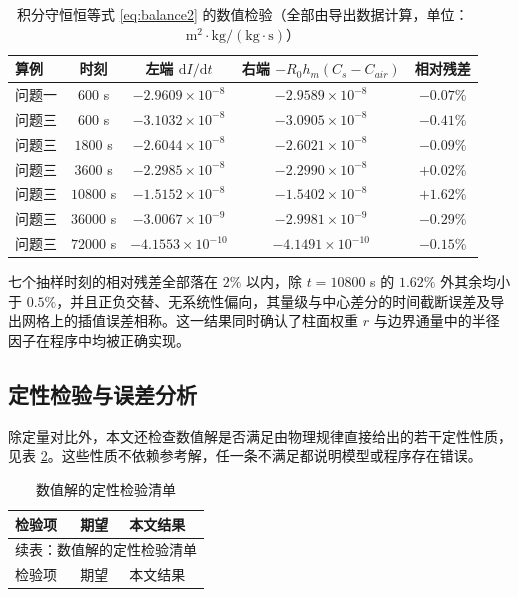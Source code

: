 \documentclass[12pt,a4paper]{article}
\begin{document}
\begin{center}
\begin{table}[H]
\centering
\caption{积分守恒恒等式 \eqref{eq:balance2} 的数值检验（全部由导出数据计算，单位：$\mathrm{m^2\cdot kg/(kg\cdot s)}$）}
\label{tab:balance}
\begin{tabular}{lcccc}
\toprule
算例 & 时刻 & 左端 $\mathrm{d}I/\mathrm{d}t$ & 右端 $-R_0h_m(C_s-C_{air})$ & 相对残差\\
\midrule
问题一 & $600$ s & $-2.9609\times10^{-8}$ & $-2.9589\times10^{-8}$ & $-0.07\%$\\
问题三 & $600$ s & $-3.1032\times10^{-8}$ & $-3.0905\times10^{-8}$ & $-0.41\%$\\
问题三 & $1800$ s & $-2.6044\times10^{-8}$ & $-2.6021\times10^{-8}$ & $-0.09\%$\\
问题三 & $3600$ s & $-2.2985\times10^{-8}$ & $-2.2990\times10^{-8}$ & $+0.02\%$\\
问题三 & $10800$ s & $-1.5152\times10^{-8}$ & $-1.5402\times10^{-8}$ & $+1.62\%$\\
问题三 & $36000$ s & $-3.0067\times10^{-9}$ & $-2.9981\times10^{-9}$ & $-0.29\%$\\
问题三 & $72000$ s & $-4.1553\times10^{-10}$ & $-4.1491\times10^{-10}$ & $-0.15\%$\\
\bottomrule
\end{tabular}
\end{table}

七个抽样时刻的相对残差全部落在 $2\%$ 以内，除 $t=10800$ s 的 $1.62\%$ 外其余均小于 $0.5\%$，并且正负交替、无系统性偏向，其量级与中心差分的时间截断误差及导出网格上的插值误差相称。这一结果同时确认了柱面权重 $r$ 与边界通量中的半径因子在程序中均被正确实现。

\subsection{定性检验与误差分析}

除定量对比外，本文还检查数值解是否满足由物理规律直接给出的若干定性性质，见表 \ref{tab:qualitative}。这些性质不依赖参考解，任一条不满足都说明模型或程序存在错误。

{\small
\begin{longtable}{p{2.6cm}p{5.4cm}p{6.6cm}}
\caption{数值解的定性检验清单}
\label{tab:qualitative}\\
\toprule
检验项 & 期望 & 本文结果\\
\midrule
\endfirsthead

\multicolumn{3}{c}{\small 续表：数值解的定性检验清单}\\
\toprule
检验项 & 期望 & 本文结果\\
\midrule
\endhead


\end{longtable}}
\end{center}
\end{document}
